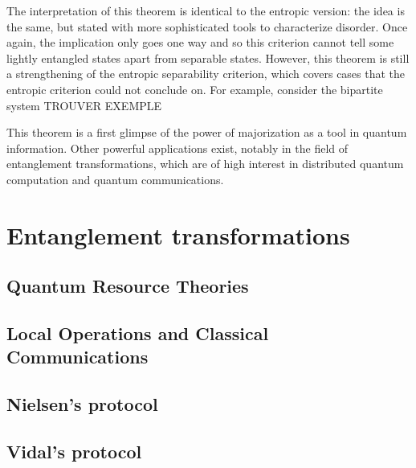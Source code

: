 The interpretation of this theorem is identical to the entropic version: the idea is the same, but stated with more sophisticated tools to characterize disorder. Once again, the implication only goes one way and so this criterion cannot tell some lightly entangled states apart from separable states. However, this theorem is still a strengthening of the entropic separability criterion, which covers cases that the entropic criterion could not conclude on. For example, consider the bipartite system TROUVER EXEMPLE

This theorem is a first glimpse of the power of majorization as a tool in quantum information. Other powerful applications exist, notably in the field of entanglement transformations, which are of high interest in distributed quantum computation and quantum communications.



\section{Entanglement transformations}

\subsection{Quantum Resource Theories} \label{sec:QRT}



\subsection{Local Operations and Classical Communications}



\subsection{Nielsen's protocol} \label{sec:nielsen}



\subsection{Vidal's protocol} \label{sec:vidal}

